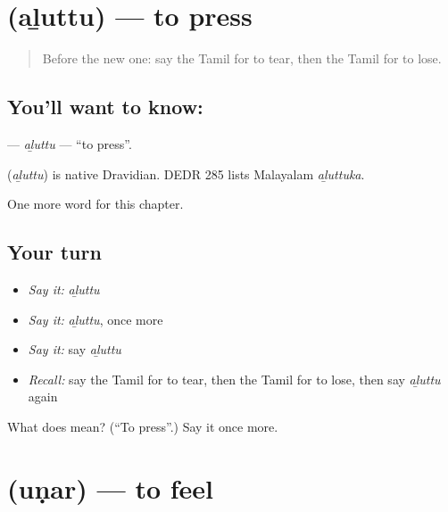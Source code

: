 \section[\texorpdfstring{\ta{அழுத்து} (aḻuttu)}{அழுத்து (aḻuttu)}]{ (aḻuttu) — to press}

\label{lesson:TA-C196-aluttu}



\begin{quote}
Before the new one: say the Tamil for to tear, then the Tamil for to lose.
\end{quote}

\subsection*{You'll want to know: }
\textbf{} — \emph{aḻuttu} — \textquotedblleft{}to press\textquotedblright{}.

\begin{cousinweb}
\textbf{} (\emph{aḻuttu}) is native Dravidian. DEDR 285 lists Malayalam \emph{aḻuttuka}.
\end{cousinweb}

\begin{grammarlens}[title={What you've built}]
One more word for this chapter.
\end{grammarlens}

\subsection*{Your turn}
\begin{itemize}
\raggedright
  \item \emph{Say it:} \emph{aḻuttu}
  \item \emph{Say it:} \emph{aḻuttu}, once more
  \item \emph{Say it:} say \emph{aḻuttu}
  \item \emph{Recall:} say the Tamil for to tear, then the Tamil for to lose, then say \emph{aḻuttu} again
\end{itemize}

\begin{tcolorbox}[breakable,colback=teal!4,colframe=teal!35!black,title={Before you move on}]
What does  mean? (\textquotedblleft{}To press\textquotedblright{}.) Say it once more.
\end{tcolorbox}
\section[\texorpdfstring{\ta{உணர்} (uṇar)}{உணர் (uṇar)}]{ (uṇar) — to feel}

